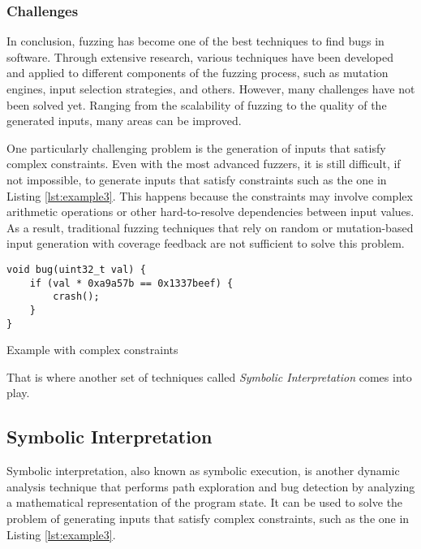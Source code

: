 \subsubsection{Challenges} \label{fuzzing:challenges}

In conclusion, fuzzing has become one of the best techniques \cite{fuzzing-a-survey-2018} to find bugs in software. Through extensive research, various techniques have been developed and applied to different components of the fuzzing process, such as mutation engines, input selection strategies, and others. However, many challenges have not been solved yet. Ranging from the scalability of fuzzing to the quality of the generated inputs, many areas can be improved.

One particularly challenging problem is the generation of inputs that satisfy complex constraints. Even with the most advanced fuzzers, it is still difficult, if not impossible, to generate inputs that satisfy constraints such as the one in Listing \ref{lst:example3}. This happens because the constraints may involve complex arithmetic operations or other hard-to-resolve dependencies between input values. As a result, traditional fuzzing techniques that rely on random or mutation-based input generation with coverage feedback are not sufficient to solve this problem.

\begin{listing}[htp]
	\centering
	\begin{minipage}{.6\linewidth}
		\begin{verbatim}
void bug(uint32_t val) {
	if (val * 0xa9a57b == 0x1337beef) {
		crash();
	}
}
		\end{verbatim}
	\end{minipage}
	\caption{Example with complex constraints}
	\label{lst:example3}
\end{listing}

That is where another set of techniques called \textit{Symbolic Interpretation} comes into play.

\subsection{Symbolic Interpretation}

Symbolic interpretation, also known as symbolic execution, is another dynamic analysis technique that performs path exploration and bug detection by analyzing a mathematical representation of the program state. It can be used to solve the problem of generating inputs that satisfy complex constraints, such as the one in Listing \ref{lst:example3}.

